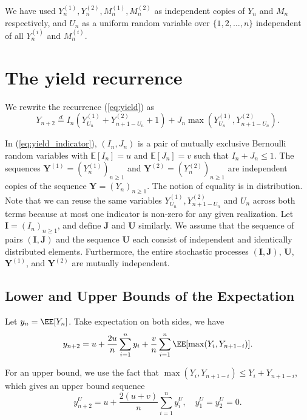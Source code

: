 We have used $Y_n^{(1)}, Y_n^{(2)}, M_n^{(1)}, M_n^{(2)}$ as independent copies of $Y_n$ and $M_n$ respectively, and $U_n$ as a uniform random variable over $\{1, 2, \ldots, n\}$ independent of all $Y_n^{(i)}$ and $M_n^{(i)}$.

\section{The yield recurrence}

We rewrite the recurrence (\ref{eq:yield}) as
\begin{equation}
  \label{eq:yield_indicator}
  Y_{n+2} \stackrel{d}{=} I_n\left(Y_{U_n}^{(1)} + Y_{n+1-U_n}^{(2)} + 1\right) + J_n\max\left(Y_{U_n}^{(1)}, Y_{n+1-U_n}^{(2)}\right).
\end{equation}

In (\ref{eq:yield_indicator}), $(I_n, J_n)$ is a pair of mutually exclusive Bernoulli random variables with $\mathbb{E}[I_n] = u$ and $\mathbb{E}[J_n] = v$ such that $I_n+J_n\le 1$. The sequences $\bm{Y}^{(1)} = (Y_n^{(1)})_{n \ge 1}$ and $\bm{Y}^{(2)} = (Y_n^{(2)})_{n \ge 1}$ are independent copies of the sequence $\bm{Y} = (Y_n)_{n \ge 1}$. The notion of equality is in distribution. Note that we can reuse the same variables $Y_{U_n}^{(1)}, Y_{n+1-U_n}^{(2)}$ and $U_n$ across both terms because at most one indicator is non-zero for any given realization. Let $\bm{I} = (I_n)_{n \ge 1}$, and define $\bm{J}$ and $\bm{U}$ similarly. We assume that the sequence of pairs $(\bm{I}, \bm{J})$ and the sequence $\bm{U}$ each consist of independent and identically distributed elements. Furthermore, the entire stochastic processes $(\bm{I}, \bm{J})$, $\bm{U}$, $\bm{Y}^{(1)}$, and $\bm{Y}^{(2)}$ are mutually independent.

\subsection{Lower and Upper Bounds of the Expectation}

Let $y_n=\EE[Y_n]$. Take expectation on both sides, we have
$$y_{n+2} = u + \dfrac{2u}{n}\sum_{i=1}^{n}y_i + \dfrac{v}{n}\sum_{i=1}^{n}\EE[\max(Y_i, Y_{n+1-i})].$$

For an upper bound, we use the fact that $\max(Y_i, Y_{n+1-i}) \le Y_i + Y_{n+1-i}$, which gives an upper bound sequence
\begin{equation}
  y_{n+2}^U = u + \dfrac{2(u+v)}{n}\sum_{i=1}^{n}y_i^U, \quad y_1^U=y_2^U=0.
  \label{eq:upper_bound}
\end{equation}

